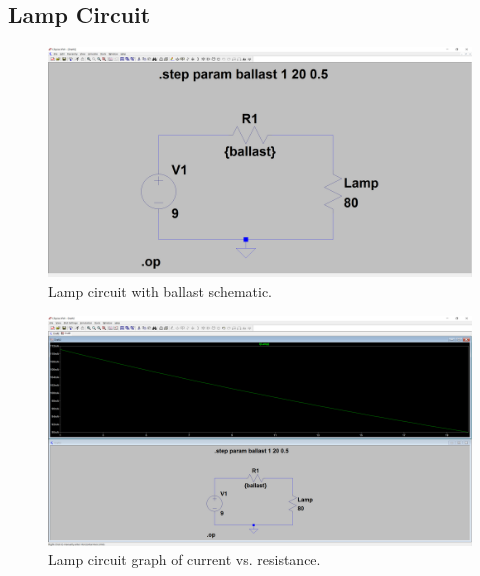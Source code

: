 \documentclass[10pt]{article}
\begin{document}
\subsection*{Lamp Circuit}
\begin{figure}[H]
	\centering
		\includegraphics[width=5in]{Capture4}
	\caption{Lamp circuit with ballast schematic.}
\end{figure}
\begin{figure}[H]
	\centering
		\includegraphics[width=5in]{Capture5}
	\caption{Lamp circuit graph of current vs. resistance.}
\end{figure}
\end{document}

